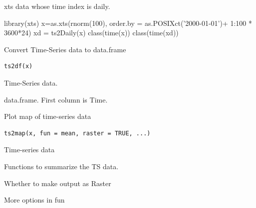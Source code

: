 \documentclass[a4paper]{book}
\begin{document}
%
\begin{Value}
xts data whose time index is daily.
\end{Value}
%
\begin{Examples}
\begin{ExampleCode}
library(xts)
x=as.xts(rnorm(100), order.by = as.POSIXct('2000-01-01')+ 1:100 * 3600*24)
xd = ts2Daily(x)
class(time(x))
class(time(xd))
\end{ExampleCode}
\end{Examples}
%
\begin{Description}\relax
Convert Time-Series data to data.frame
\end{Description}
%
\begin{Usage}
\begin{verbatim}
ts2df(x)
\end{verbatim}
\end{Usage}
%
\begin{Arguments}
\begin{ldescription}
\item[\code{x}] Time-Series data.
\end{ldescription}
\end{Arguments}
%
\begin{Value}
data.frame. First column is Time.
\end{Value}
%
\begin{Description}\relax
Plot map of time-series data
\end{Description}
%
\begin{Usage}
\begin{verbatim}
ts2map(x, fun = mean, raster = TRUE, ...)
\end{verbatim}
\end{Usage}
%
\begin{Arguments}
\begin{ldescription}
\item[\code{x}] Time-series data

\item[\code{fun}] Functions to summarize the TS data.

\item[\code{raster}] Whether to make output as Raster

\item[\code{...}] More options in fun
\end{ldescription}
\end{Arguments}
\end{document}
